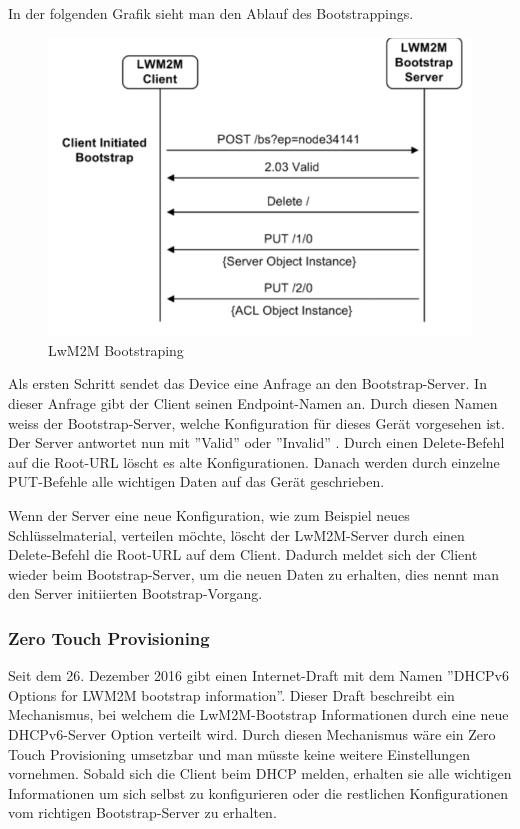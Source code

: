 In der folgenden Grafik sieht man den Ablauf des Bootstrappings.
\begin{figure}[H]
\includegraphics[scale=0.5]{../02_Analyse/images/lwm2m/bootstrap_diagram.png}
\caption{LwM2M Bootstraping\cite{LwM2MInterfaces}}
\end{figure}
Als ersten Schritt sendet das Device eine Anfrage an den Bootstrap-Server. In dieser Anfrage gibt der Client seinen Endpoint-Namen an. Durch diesen Namen weiss der Bootstrap-Server, welche Konfiguration für dieses Gerät vorgesehen ist. Der Server antwortet nun mit ''Valid'' oder ''Invalid'' . Durch einen Delete-Befehl auf die Root-URL löscht es alte Konfigurationen. Danach werden durch einzelne PUT-Befehle alle wichtigen Daten auf das Gerät geschrieben.

Wenn der Server eine neue Konfiguration, wie zum Beispiel neues Schlüsselmaterial, verteilen möchte, löscht der LwM2M-Server durch einen Delete-Befehl die Root-URL auf dem Client. Dadurch meldet sich der Client wieder beim Bootstrap-Server, um die neuen Daten zu erhalten, dies nennt man den Server initiierten Bootstrap-Vorgang.

\subsubsection{Zero Touch Provisioning}
Seit dem 26. Dezember 2016 gibt einen Internet-Draft mit dem Namen ''DHCPv6 Options for LWM2M bootstrap information''. Dieser Draft beschreibt ein Mechanismus, bei welchem die LwM2M-Bootstrap Informationen durch eine neue DHCPv6-Server Option verteilt wird. Durch diesen Mechanismus wäre ein Zero Touch Provisioning umsetzbar und man müsste keine weitere Einstellungen vornehmen. Sobald sich die Client beim DHCP melden, erhalten sie alle wichtigen Informationen um sich selbst zu konfigurieren oder die restlichen Konfigurationen vom richtigen Bootstrap-Server zu erhalten.

